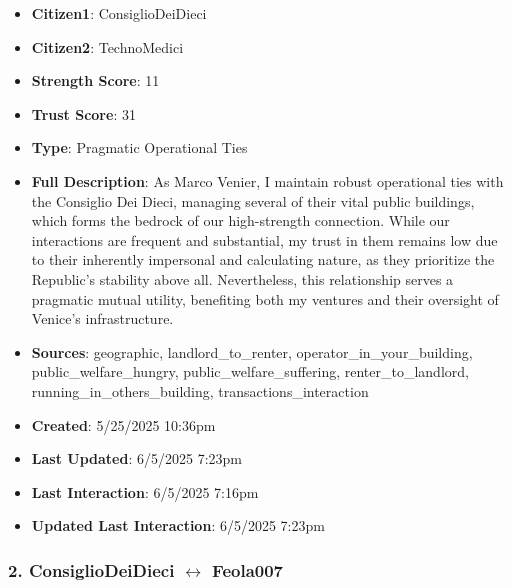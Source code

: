\documentclass[11pt,a4paper]{article}
\begin{document}
\begin{itemize}
\item \textbf{Citizen1}: ConsiglioDeiDieci
\item \textbf{Citizen2}: TechnoMedici
\item \textbf{Strength Score}: 11
\item \textbf{Trust Score}: 31
\item \textbf{Type}: Pragmatic Operational Ties
\item \textbf{Full Description}: As Marco Venier, I maintain robust operational ties with the Consiglio Dei Dieci, managing several of their vital public buildings, which forms the bedrock of our high-strength connection. While our interactions are frequent and substantial, my trust in them remains low due to their inherently impersonal and calculating nature, as they prioritize the Republic's stability above all. Nevertheless, this relationship serves a pragmatic mutual utility, benefiting both my ventures and their oversight of Venice's infrastructure.
\item \textbf{Sources}: geographic, landlord\_to\_renter, operator\_in\_your\_building, public\_welfare\_hungry, public\_welfare\_suffering, renter\_to\_landlord, running\_in\_others\_building, transactions\_interaction
\item \textbf{Created}: 5/25/2025 10:36pm
\item \textbf{Last Updated}: 6/5/2025 7:23pm
\item \textbf{Last Interaction}: 6/5/2025 7:16pm
\item \textbf{Updated Last Interaction}: 6/5/2025 7:23pm
\end{itemize}

\subsubsection{2. ConsiglioDeiDieci $\leftrightarrow$ Feola007}
\end{document}
